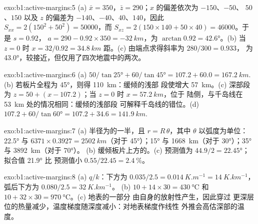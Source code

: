 \begin{solution}{exo:b1:active-margins:5}
(a) $\bar x = 350$，$\bar z = 290$；$x$ 的偏差依次为 $-150$、$-50$、
$50$、$150$ 以及 $z$ 的偏差为 $-140$、$-40$、$40$、$140$，因此
$S_{xx} = 2(150^2 + 50^2) = \num{50000}$，而
$S_{xz} = 2(150\times140 + 50\times40) = \num{46000}$。于是 $s = 0.92$，
$a = 290 - 0.92\times350 = \qty{-32}{km}$，为
$\arctan 0.92 = \ang{42.6}$。(b) 当 $z = 0$ 时 $x = 32/0.92 = \qty{34.8}{km}$
距。(c) 由端点求得斜率为 $280/300 = 0.933$，
为 \ang{43.0}，较接近，但仅用了四次地震中的两次。
\end{solution}

\begin{solution}{exo:b1:active-margins:6}
(a) $50/\tan\ang{25} + 60/\tan\ang{45} = 107.2 + 60.0 = \qty{167.2}{km}$.
(b) 若板片全程为 \ang{45}，则得 \qty{110}{km}：缓倾的浅部
段使增大 \qty{57}{km}。(c) 深部段为
$z = 50 + (x - 107.2)$；当 $z = 0$ 时 $x = \qty{57.2}{km}$，位于
陆侧，与千岛线在 \qty{53}{km} 处的情况相同：缓倾的浅部段
可解释千岛线的错位。(d) $107.2 + 60/\tan\ang{60} = 107.2 + 34.6 =
\qty{141.9}{km}$.
\end{solution}

\begin{solution}{exo:b1:active-margins:7}
(a) 半径为的一半，且 $r = R\,\theta$，其中 $\theta$ 以弧度为单位：
\ang{22.5} 与 $6371\times0.3927 = \qty{2502}{km}$（对于 \ang{45}）；\ang{15} 与
\qty{1668}{km}（对于 \ang{30}）；\ang{35} 与 \qty{3892}{km}（对于 \ang{70}）。
(b) 缓倾板片上方的。(c) 预测值为
$44.9/2 = \ang{22.45}$；拟合值 \ang{21.9} 比
预测值小 $0.55/22.45 = \qty{2.4}{\percent}$。
\end{solution}

\begin{solution}{exo:b1:active-margins:8}
(a) $q/k$：下方为 $0.035/2.5 = \qty{0.014}{K.m^{-1}} = \qty{14}{K.km^{-1}}$，
弧后下方为 $0.080/2.5 = \qty{32}{K.km^{-1}}$。
(b) $10 + 14\times30 = \qty{430}{\celsius}$ 和
$10 + 32\times30 = \qty{970}{\celsius}$。(c) 地表的一部分
由自身的放射性产生，因此穿过
更深层位的热量减少，温度梯度随深度减小：对地表梯度作线性
外推会高估深部的温度。
\end{solution}

